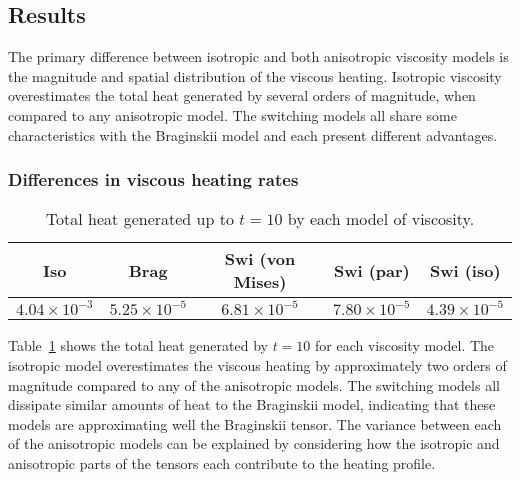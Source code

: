 \subsection{Results}

\label{sec:slow_null_results}

The primary difference between isotropic and both anisotropic viscosity models is the magnitude and spatial distribution of the viscous heating. Isotropic viscosity overestimates the total heat generated by several orders of magnitude, when compared to any anisotropic model. The switching models all share some characteristics with the Braginskii model and each present different advantages.

\subsubsection{Differences in viscous heating rates}

\begin{table}[t]
  \centering
  \caption{Total heat generated up to $t=10$ by each model of viscosity.}
  \label{tab:total_heating_slow_null}
  \begin{tabular}{ccccc}
Iso & Brag & Swi (von Mises) & Swi (par) & Swi (iso)\\
\midrule
$4.04 \times 10^{-3}$ & $5.25 \times 10^{-5}$ & $6.81 \times 10^{-5}$ & $7.80 \times 10^{-5}$ & $4.39 \times 10^{-5}$
\end{tabular}
\end{table}

Table~\ref{tab:total_heating_slow_null} shows the total heat generated by $t=10$ for each viscosity model. The isotropic model overestimates the viscous heating by approximately two orders of magnitude compared to any of the anisotropic models. The switching models all dissipate similar amounts of heat to the Braginskii model, indicating that these models are approximating well the Braginskii tensor. The variance between each of the anisotropic models can be explained by considering how the isotropic and anisotropic parts of the tensors each contribute to the heating profile.

